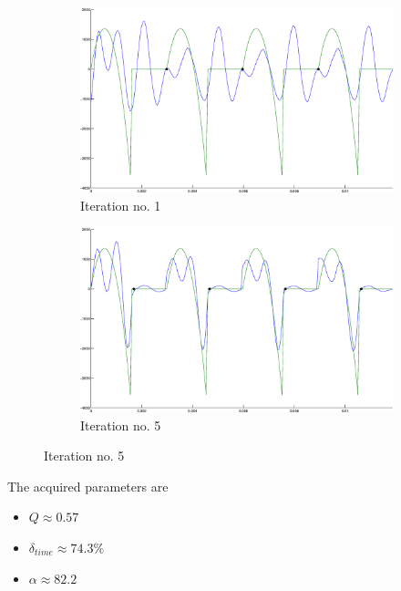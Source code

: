 \documentclass[12pt,a4]{article}
\begin{document}
\begin{figure}[H]
 \centering
 \begin{subfigure}{.55\textwidth}
  \includegraphics[scale=.22]{img/Roope-1.eps}
  \caption{Iteration no. 1}
 \end{subfigure}%
 \begin{subfigure}{.5\textwidth}
  \includegraphics[scale=.22]{img/Roope-5.eps}
  \caption{Iteration no. 5}
 \end{subfigure}
 \end{figure}
 The acquired parameters are
 \begin{itemize}
  \item $Q \approx 0.57$  
  \item $\delta_{time} \approx 74.3\%$
  \item $\alpha \approx 82.2$ 
 \end{itemize}
  
\end{document}
